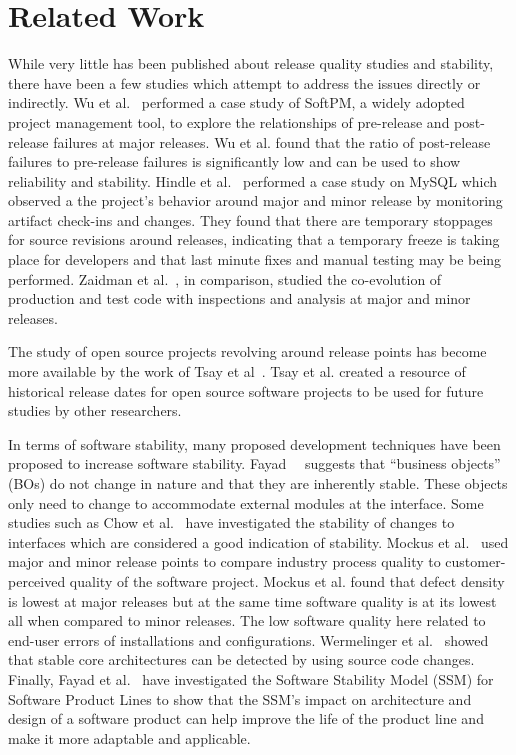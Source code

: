 \documentclass[conference]{IEEEtran}
\begin{document}
\section{Related Work}
\label{sec:rel}
While very little has been published about release quality studies and stability, there have been a few studies which attempt to address the issues directly
or indirectly. Wu et al.~\cite{Wu:2008:QAF} performed a case study of SoftPM, a widely adopted project management tool, to explore the relationships of
pre-release and post-release failures at major releases. Wu et al. found that the ratio of post-release failures to pre-release failures is significantly low
and can be used to show reliability and stability. Hindle et al.~\cite{Hindle:2007:RPD} performed a case study on MySQL which observed a the project's behavior
around major and minor release by monitoring artifact check-ins and changes. They found that there are temporary stoppages for source revisions around releases,
indicating that a temporary freeze is taking place for developers and that last minute fixes and manual testing may be being performed.
Zaidman et al.~\cite{Zaidman:2011:SCP}, in comparison, studied the co-evolution of production and test code with inspections and analysis
at major and minor releases. 

The study of open source projects revolving around release points has become more available by the work of Tsay et al~\cite{Tsay:2011:EMO}. Tsay et al. created
a resource of historical release dates for open source software projects to be used for future studies by other researchers.

In terms of software stability, many proposed development techniques have been proposed to increase software stability. 
Fayad~\cite{Fayad:2001:TOI}~\cite{Fayad:2002:ASS} suggests that ``business objects'' (BOs) do not change in nature and that they are inherently stable. These
objects only need to change to accommodate external modules at the interface. Some studies such as Chow et al.~\cite{Chow:2011:SJI} have investigated
the stability of changes to interfaces which are considered a good indication of stability.
Mockus et al.~\cite{Mockus:2008:IQR} used major and minor release points to compare industry process quality to customer-perceived quality of the software
project. Mockus et al. found that defect density is lowest at major releases but at the same time software quality is at its lowest all when compared to minor
releases. The low software quality here related to end-user errors of installations and configurations. Wermelinger et al.~\cite{Wermelinger:2008:AEE}
showed that stable core architectures can be detected by using source code changes. Finally, Fayad et al.~\cite{Fayad:2010:SSM} have
investigated the Software Stability Model (SSM) for Software Product Lines to show that the SSM's impact on architecture and design of a software product
can help improve the life of the product line and make it more adaptable and applicable.
\end{document}

